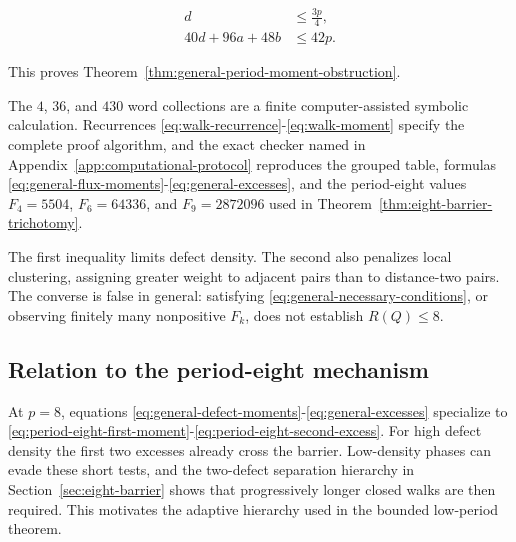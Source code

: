 \begin{equation}
\label{eq:general-necessary-conditions}
\begin{aligned}
d&\leq \frac{3p}{4}, \\
40d+96a+48b&\leq 42p.
\end{aligned}
\end{equation}

This proves Theorem~\ref{thm:general-period-moment-obstruction}.

The \(4\), \(36\), and \(430\) word collections are a finite computer-assisted
symbolic calculation. Recurrences \eqref{eq:walk-recurrence}-\eqref{eq:walk-moment} specify the complete proof
algorithm, and the exact checker named in Appendix~\ref{app:computational-protocol} reproduces the grouped
table, formulas \eqref{eq:general-flux-moments}-\eqref{eq:general-excesses}, and the period-eight values
\(F_{4}=5504\), \(F_{6}=64336\), and \(F_{9}=2872096\) used in Theorem~\ref{thm:eight-barrier-trichotomy}.

The first inequality limits defect density. The second also penalizes local
clustering, assigning greater weight to adjacent pairs than to distance-two
pairs. The converse is false in general: satisfying \eqref{eq:general-necessary-conditions}, or observing
finitely many nonpositive \(F_k\), does not establish \(R(Q)\leq 8\).

\subsection{Relation to the period-eight mechanism}

At \(p=8\), equations \eqref{eq:general-defect-moments}-\eqref{eq:general-excesses} specialize to \eqref{eq:period-eight-first-moment}-\eqref{eq:period-eight-second-excess}. For high defect
density the first two excesses already cross the barrier. Low-density phases
can evade these short tests, and the two-defect separation hierarchy in
Section~\ref{sec:eight-barrier} shows that progressively longer closed walks are then required.
This motivates the adaptive hierarchy used in the bounded low-period theorem.
